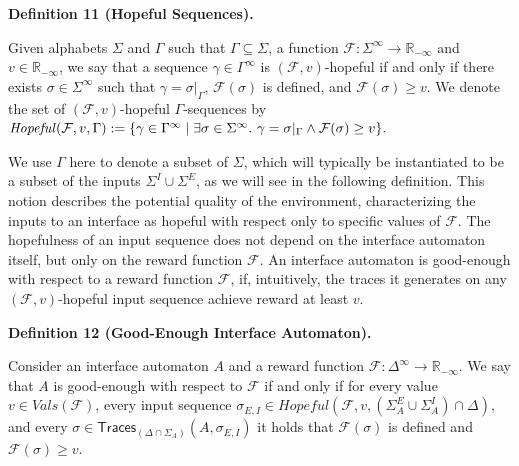  
 
\par\medskip\noindent\textbf{Definition 11 (Hopeful Sequences).}\par
 
 
Given alphabets $\Sigma$ and $\Gamma$ such that $\Gamma\subseteq\Sigma$, a function $\mathcal{F}:\Sigma^{\infty}\to\mathbb{R}_{-\infty}$ and $v\in\mathbb{R}_{-\infty}$, we say that a sequence $\gamma\in\Gamma^{\infty}$ is $(\mathcal{F},v)$-hopeful if and only if there exists $\sigma\in\Sigma^{\infty}$ such that $\gamma=\sigma|_{\Gamma}$, $\mathcal{F}(\sigma)$ is defined, and $\mathcal{F}(\sigma)\geq v$. We denote the set of $(\mathcal{F},v)$-hopeful $\Gamma$-sequences by $\mathit{Hopeful}(\mathcal{F},v,\Gamma):=\{\gamma\in\Gamma^{\infty}\mid\exists\sigma\in\Sigma^{\infty}.\nobreak\ \gamma=\sigma|_{\Gamma}\land\mathcal{F}(\sigma)\geq v\}.$\par
 
 
 
 
We use $\Gamma$ here to denote a subset of $\Sigma$, which will typically be instantiated to be a subset of the inputs $\Sigma^{I}\cup\Sigma^{E}$, as we will see in the following definition. This notion describes the potential quality of the environment, characterizing the inputs to an interface as hopeful with respect only to specific values of $\mathcal{F}$. The hopefulness of an input sequence does not depend on the interface automaton itself, but only on the reward function $\mathcal{F}$. An interface automaton is good-enough with respect to a reward function $\mathcal{F}$, if, intuitively, the traces it generates on any $(\mathcal{F},v)$-hopeful input sequence achieve reward at least $v$.\par
 
 
 
\par\medskip\noindent\textbf{Definition 12 (Good-Enough Interface Automaton).}\par
 
 
Consider an interface automaton $A$ and a reward function $\mathcal{F}:\Delta^{\infty}\to\mathbb{R}_{-\infty}$. We say that $A$ is good-enough with respect to $\mathcal{F}$ if and only if for every value $v\in\mathit{Vals}(\mathcal{F})$, every input sequence $\sigma_{E,I}\in\mathit{Hopeful}(\mathcal{F},v,(\Sigma_{A}^{E}\cup\Sigma_{A}^{I})\cap\Delta)$, and every $\sigma\in\mathsf{Traces}_{(\Delta\cap\Sigma_{A})}(A,\sigma_{E,I})$ it holds that $\mathcal{F}(\sigma)$ is defined and $\mathcal{F}(\sigma)\geq v$.\par
 

